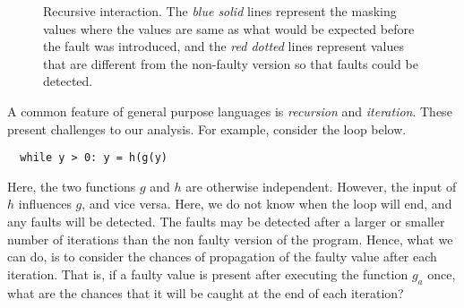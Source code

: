 \documentclass[preprint,nonatbib]{sigplanconf}\usepackage[]{graphicx}\usepackage[]{color}
\begin{document}
\begin{figure}
\centering
{}
\caption{Recursive interaction. The \emph{blue solid} lines represent the masking values where the values are same as what would be expected before the fault was introduced, and the \emph{red dotted} lines represent values that are different from the non-faulty version so that faults could be detected.}
\label{fig:recursion}
\end{figure}

A common feature of general purpose languages is \emph{recursion} and
\emph{iteration}. These present challenges to our analysis. For example,
consider the loop below.

\begin{lstlisting}
  while y > 0: y = h(g(y)
\end{lstlisting}

Here, the two functions $g$ and $h$ are otherwise independent. However, the
input of $h$ influences $g$, and vice versa. Here, we do not know when the
loop will end, and any faults will be detected. The faults may be detected
after a larger or smaller number of iterations than the non faulty version
of the program. Hence, what we can do, is to consider the chances of
propagation of the faulty value after each iteration. That is, if a faulty
value is present after executing the function $g_a$ once, what are the
chances that it will be caught at the end of each iteration?
\end{document}
